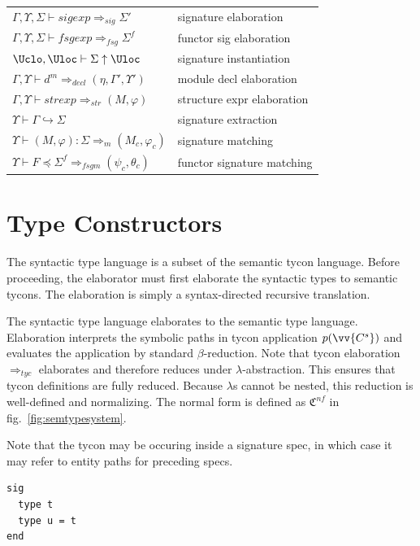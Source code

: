 \documentclass[9pt,nocopyrightspace, fleqn]{sigplanconf}
\begin{document}
\begin{tabular}{ll}      
$\Gamma,\Upsilon,\Sigma\vdash sigexp \Rightarrow_{sig} \Sigma'$ & signature elaboration\\
$\Gamma,\Upsilon,\Sigma\vdash fsgexp \Rightarrow_{fsg} \Sigma^f$ & functor sig elaboration\\
        $\Uclo,\Uloc\vdash \Sigma \uparrow \Uloc$ & signature instantiation\\
        $\Gamma,\Upsilon\vdash d^m \Rightarrow_{decl} (\eta,\Gamma',\Upsilon')$ & module decl elaboration\\
        $\Gamma,\Upsilon\vdash strexp \Rightarrow_{str} (M, \varphi)$ & structure expr elaboration\\
        $\Upsilon\vdash\Gamma\hookrightarrow \Sigma$ & signature extraction\\
        $\Upsilon\vdash(M,\varphi):\Sigma\Rightarrow_{m} (M_c,\varphi_c)$ & signature matching\\
        $\Upsilon\vdash F \preceq \Sigma^f \Rightarrow_{fsgm} (\psi_c, \theta_c)$ & functor signature matching
\end{tabular}

\section{Type Constructors}
The syntactic type language is a subset of the semantic tycon language. Before proceeding, the elaborator must first elaborate the syntactic types to semantic tycons. The elaboration is simply a syntax-directed recursive translation. 

The syntactic type language elaborates to the semantic type language. Elaboration interprets the symbolic paths in tycon application $p(\vv{C^s})$ and evaluates the application by standard $\beta$-reduction. Note that tycon elaboration $\Rightarrow_{tyc }$ elaborates and therefore reduces under $\lambda$-abstraction. This ensures that tycon definitions are fully reduced. Because $\lambda$s cannot be nested, this reduction is well-defined and normalizing. The normal form is defined as $\mathfrak{C}^{nf}$ in fig.~\ref{fig:semtypesystem}. 

Note that the tycon may be occuring inside a signature spec, in which case it may refer to entity paths for preceding specs. 

\begin{lstlisting}
sig 
  type t
  type u = t
end
\end{lstlisting}
\end{document}
